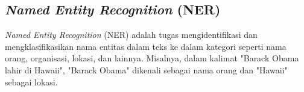 \subsection{\textit{Named Entity Recognition} (NER)}

\textit{Named Entity Recognition} (NER) adalah tugas mengidentifikasi dan mengklasifikasikan nama entitas dalam teks ke dalam kategori seperti nama orang, organisasi, lokasi, dan lainnya. Misalnya, dalam kalimat "Barack Obama lahir di Hawaii", "Barack Obama"  dikenali sebagai nama orang dan "Hawaii" sebagai lokasi.
